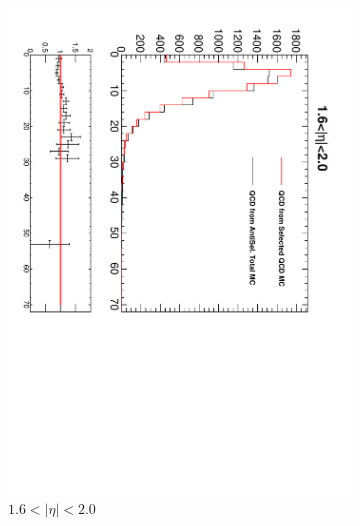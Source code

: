 \begin{figure}[htbp]
\begin{subfigure}{0.4\textwidth}
    \includegraphics*[trim = 0mm 0mm 15mm 0mm, clip, width=\textwidth, angle=90]{MetCompare_anti_eta5.pdf}
    \caption{$1.6<| \eta |<2.0$}
    \label{fig:qcd_met_eta5}
  \end{subfigure}
  \begin{subfigure}{0.4\textwidth}
    \centering

\end{subfigure}
\end{figure}
